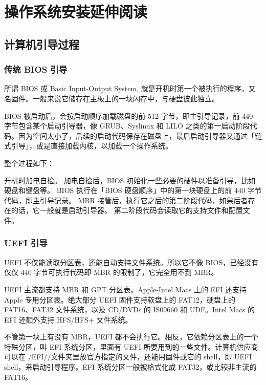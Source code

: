 \documentclass[doctor,openright,twoside]{sjtuthesis}
\newcommand\setdefaultfigure{\floatplacement{figure}{htp}}
\theoremstyle{plain}
\theoremstyle{definition}
\theoremstyle{remark}
\theoremstyle{ocrenumbox}
\theoremstyle{plain}
\begin{document}
\setdefaultfigure

\hypertarget{install-further-read}{%
\chapter{操作系统安装延伸阅读}\label{install-further-read}}

\hypertarget{section-160}{%
\section{计算机引导过程}\label{section-160}}

\hypertarget{bios-}{%
\subsection{传统 BIOS 引导}\label{bios-}}

所谓 BIOS 或 Basic Input-Output System, 就是开机时第一个被执行的程序，又名固件。一般来说它储存在主板上的一块闪存中，与硬盘彼此独立。

BIOS 被启动后，会按启动顺序加载磁盘的前 512 字节，即主引导记录，前 440 字节包含某个启动引导器，像 GRUB、Syslinux 和 LILO 之类的第一启动阶段代码。因为空间太小了，后续的启动代码保存在磁盘上，最后启动引导器又通过「链式引导」，或是直接加载内核，以加载一个操作系统。

整个过程如下：

开机时加电自检。 加电自检后，BIOS 初始化一些必要的硬件以准备引导，比如硬盘和键盘等。 BIOS 执行在「BIOS 硬盘顺序」中的第一块硬盘上的前 440 字节代码，即主引导记录。 MBR 接管后，执行它之后的第二阶段代码，如果后者存在的话，它一般就是启动引导器。 第二阶段代码会读取它的支持文件和配置文件。

\hypertarget{uefi-}{%
\subsection{UEFI 引导}\label{uefi-}}

UEFI 不仅能读取分区表，还能自动支持文件系统。所以它不像 BIOS，已经没有仅仅 440 字节可执行代码即 MBR 的限制了，它完全用不到 MBR。

UEFI 主流都支持 MBR 和 GPT 分区表。Apple-Intel Macs 上的 EFI 还支持 Apple 专用分区表。绝大部分 UEFI 固件支持软盘上的 FAT12，硬盘上的 FAT16、FAT32 文件系统，以及 CD/DVDs 的 IS09660 和 UDF。Intel Macs 的 EFI 还额外支持 HFS/HFS+ 文件系统。

不管第一块上有没有 MBR，UEFI 都不会执行它。相反，它依赖分区表上的一个特殊分区，叫 EFI 系统分区，里面有 UEFI 所要用到的一些文件。计算机供应商可以在 /EFI//文件夹里放官方指定的文件，还能用固件或它的 shell，即 UEFI shell，来启动引导程序。EFI 系统分区一般被格式化成 FAT32，或比较非主流的 FAT16。
\end{document}
